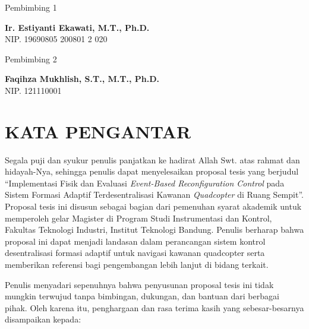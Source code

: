 \documentclass[12pt,a4paper]{report}
\numberwithin{equation}{chapter}
\begin{document}
\vspace{1.2cm}

\noindent
\begin{minipage}[t]{0.49\textwidth}
    \centering
    Pembimbing 1

    \vspace{2.5cm}

    {\bfseries Ir. Estiyanti Ekawati, M.T., Ph.D.}\\
    NIP. 19690805 200801 2 020
\end{minipage}
\hfill
\begin{minipage}[t]{0.49\textwidth}
    \centering
    Pembimbing 2

    \vspace{2.5cm}

    {\bfseries Faqihza Mukhlish, S.T., M.T., Ph.D.}\\
    NIP. 121110001 
\end{minipage}

\chapter*{KATA PENGANTAR}

Segala puji dan syukur penulis panjatkan ke hadirat Allah Swt. atas rahmat dan hidayah-Nya, sehingga penulis dapat menyelesaikan proposal tesis yang berjudul ``Implementasi Fisik dan Evaluasi \textit{Event-Based Reconfiguration Control} pada Sistem Formasi Adaptif Terdesentralisasi Kawanan \textit{Quadcopter} di Ruang Sempit''. Proposal tesis ini disusun sebagai bagian dari pemenuhan syarat akademik untuk memperoleh gelar Magister di Program Studi Instrumentasi dan Kontrol, Fakultas Teknologi Industri, Institut Teknologi Bandung. Penulis berharap bahwa proposal ini dapat menjadi landasan dalam perancangan sistem kontrol desentralisasi formasi adaptif untuk navigasi kawanan quadcopter serta memberikan referensi bagi pengembangan lebih lanjut di bidang terkait.

Penulis menyadari sepenuhnya bahwa penyusunan proposal tesis ini tidak mungkin terwujud tanpa bimbingan, dukungan, dan bantuan dari berbagai pihak. Oleh karena itu, penghargaan dan rasa terima kasih yang sebesar-besarnya disampaikan kepada:
\end{document}
